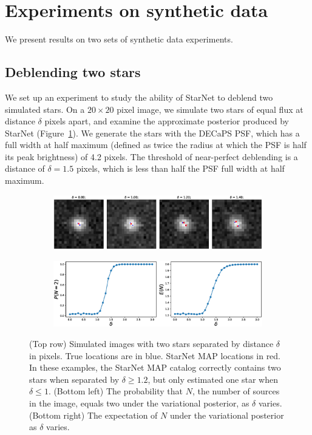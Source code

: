 \section{Experiments on synthetic data}

We present results on two sets of synthetic data experiments.

\subsection{Deblending two stars}

We set up an experiment to study the
ability of StarNet to deblend two simulated stars.
On a $20\times20$ pixel image,
we simulate two stars of equal flux at distance $\delta$ pixels apart, and
examine the approximate posterior produced by StarNet (Figure~\ref{fig:deblending_fig}).
We generate the stars with the DECaPS PSF, which 
has a full width at half maximum 
(defined as twice the radius at which the PSF is half its peak brightness) of 4.2 pixels. 
The threshold of near-perfect deblending is a distance of $\delta = 1.5$ pixels, which is less than half the PSF 
full width at half maximum. 

\begin{figure}[tb]
    \centering
    \begin{subfigure}{0.8\textwidth}
        \includegraphics[width=\textwidth]{figures_vg/deblending/example_deblending.eps}
    \end{subfigure}
    \begin{subfigure}{0.8\textwidth}
        \includegraphics[width=\textwidth]{figures_vg/deblending/summary_statistics.eps}
    \end{subfigure}
    \caption{(Top row) Simulated images with two stars separated by distance $\delta$ in pixels.
    True locations are in blue. StarNet MAP locations in red. 
    In these examples, the StarNet MAP catalog correctly contains two stars when separated by $\delta \geq 1.2$,
    but only estimated one star when $\delta \leq 1$.
    (Bottom left) The probability that $N$, the number of sources in the image, equals two
    under the variational posterior, as $\delta$ varies.
    (Bottom right) The expectation of $N$ under the variational posterior as $\delta$ varies. }
    \label{fig:deblending_fig}
\end{figure}

